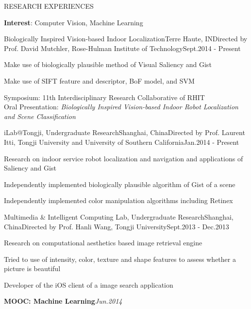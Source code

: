 \documentclass{resume} %
\begin{document}
\begin{rSection}{RESEARCH EXPERIENCES}

  {\bf Interest}: Computer Vision, Machine Learning \vspace{0.5em}

  \begin{rSubsection}{Biologically Inspired Vision-based Indoor Localization}{Terre Haute, IN}{Directed by Prof. David
    Mutchler, Rose-Hulman Institute of Technology}{Sept.2014 - Present}
  \item Make use of biologically plausible method of Visual Saliency and Gist
  \item Make use of SIFT feature and descriptor, BoF model, and SVM
  \item Symposium: 11th Interdisciplinary Research Collaborative of RHIT \\
    \hspace{\labelwidth}Oral Presentation: {\em Biologically Inspired Vision-based Indoor Robot Localization and Scene Classification}
  \end{rSubsection}


  \begin{rSubsection}{iLab@Tongji, Undergraduate Research}{Shanghai, China}{Directed by Prof. Laurent Itti, Tongji
    University and University of Southern California}{Jan.2014 - Present}
  \item Research on indoor service robot localization and navigation and applications of Saliency and Gist
  \item Independently implemented biologically plausible algorithm of Gist of a scene
  \item Independently implemented color manipulation algorithms including Retinex
  \end{rSubsection}


  \begin{rSubsection}{Multimedia \& Intelligent Computing Lab, Undergraduate Research}{Shanghai, China}{Directed by Prof. Hanli Wang, Tongji
    University}{Sept.2013 - Dec.2013}
  \item Research on computational aesthetics based image retrieval engine
  \item Tried to use of intensity, color, texture and shape features to assess whether a picture is beautiful
  \item Developer of the iOS client of a image search application
  \end{rSubsection}

  {\bf MOOC: Machine Learning}\hfill{\em Jun.2014}

\end{rSection}
\end{document}
